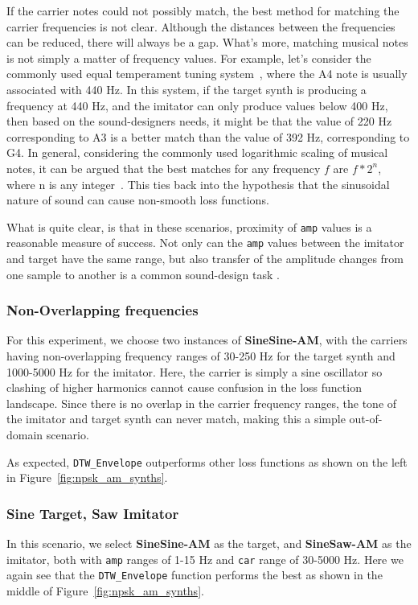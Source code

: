 \documentclass{article} %
\newcommand{\highlight}[1]{\textcolor[RGB]{00,150,00}{#1}}
\newcommand{\DTWEnv}{\texttt{DTW\_Envelope}\xspace}
\newcommand{\FMMod}{\textbf{SineSaw-AM}\xspace}
\newcommand{\FMModvtwo}{\textbf{SineSine-AM}\xspace}
\begin{document}
If the carrier notes could not possibly match, the best method for matching the carrier frequencies is not clear. Although the distances between the frequencies can be reduced, there will always be a gap. What's more, matching musical notes is not simply a matter of frequency values. For example, let's consider the commonly used equal temperament tuning system~\cite{sethares2005tuning}, where the A4 note is usually associated with 440 Hz. In this system, if the target synth is producing a frequency at 440 Hz, and the imitator can only produce values below 400 Hz, then based on the sound-designers needs, it might be that the value of 220 Hz corresponding to A3 is a better match than the value of 392 Hz, corresponding to G4. In general, considering the commonly used logarithmic scaling of musical notes, it can be argued that the best matches for any frequency $f$ are $f*2^{n}$, where n is any integer~\cite{young1939terminology}. \highlight{This ties back into the hypothesis that the sinusoidal nature of sound can cause non-smooth loss functions.}

What is quite clear, is that in these scenarios, proximity of \texttt{amp} values is a reasonable measure of success. Not only can the \texttt{amp} values between the imitator and target have the same range, but also transfer of the amplitude changes from one sample to another is a common sound-design task \cite{engel2020ddsp}.  

\subsubsection{Non-Overlapping frequencies}
\label{sec:am_sound_matching_nonoverlapping}
For this experiment, we choose two instances of \FMModvtwo, with the carriers having non-overlapping frequency ranges of 30-250 Hz for the target synth and 1000-5000 Hz for the imitator. Here, the carrier is simply a sine oscillator so clashing of higher harmonics cannot cause confusion in the loss function landscape. Since there is no overlap in the carrier frequency ranges, the tone of the imitator and target synth can never match, making this a simple out-of-domain scenario. 

As expected, \DTWEnv outperforms other loss functions as shown on the left in Figure~\ref{fig:npsk_am_synths}. 

\subsubsection{Sine Target, Saw Imitator}
\label{sec:am_sinetarget_sawimitate}
In this scenario, we select \FMModvtwo as the target, and \FMMod as the imitator, both with \texttt{amp} ranges of 1-15 Hz and \texttt{car} range of 30-5000 Hz. Here we again see that the \DTWEnv function performs the best as shown in the middle of Figure~\ref{fig:npsk_am_synths}.
\end{document}
